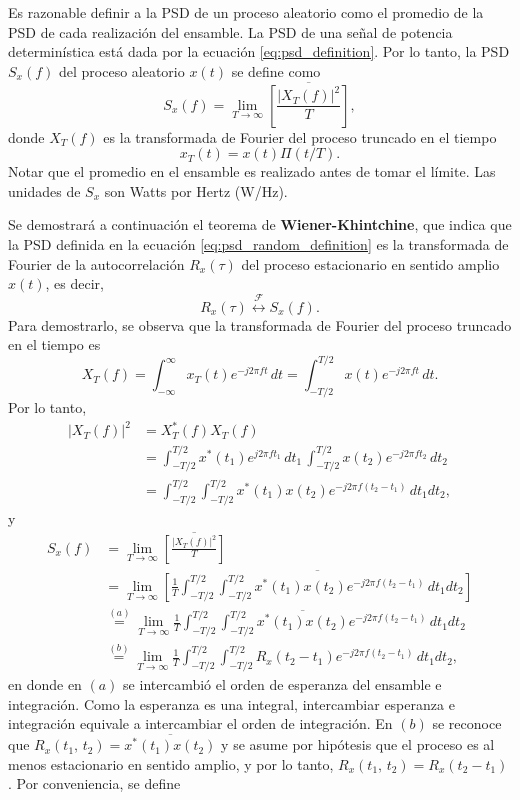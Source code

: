 \documentclass[a4paper]{article}
\begin{document}
Es razonable definir a la PSD de un proceso aleatorio como el promedio de la PSD de cada realización del ensamble. La PSD de una señal de potencia determinística está dada por la ecuación \ref{eq:psd_definition}. Por lo tanto, la PSD \(S_x(f)\) del proceso aleatorio \(x(t)\) se define como
\begin{equation}\label{eq:psd_random_definition}
 S_x(f)=\lim_{T\to\infty}\overline{\left[\frac{|X_T(f)|^2}{T}\right]},
\end{equation}
donde \(X_T(f)\) es la transformada de Fourier del proceso truncado en el tiempo
\[
 x_T(t)=x(t)\Pi(t/T).
\]
Notar que el promedio en el ensamble es realizado antes de tomar el límite. Las unidades de \(S_x\) son Watts por Hertz (W/Hz).

Se demostrará a continuación el teorema de \textbf{Wiener-Khintchine}, que indica que la PSD definida en la ecuación \ref{eq:psd_random_definition} es la transformada de Fourier de la autocorrelación \(R_x(\tau)\) del proceso estacionario en sentido amplio \(x(t)\), es decir,
\[
 R_x(\tau)\overset{\mathcal{F}}{\longleftrightarrow}S_x(f).
\]
Para demostrarlo, se observa que la transformada de Fourier del proceso truncado en el tiempo es
\[
 X_T(f)=\int_{-\infty}^{\infty}x_T(t)e^{-j2\pi ft}\,dt=\int_{-T/2}^{T/2}x(t)e^{-j2\pi ft}\,dt.
\]
Por lo tanto,
\begin{align*}
 |X_T(f)|^2 &=X^*_T(f)X_T(f)\\
   &=\int_{-T/2}^{T/2}x^*(t_1)e^{j2\pi ft_1}\,dt_1\,\int_{-T/2}^{T/2}x(t_2)e^{-j2\pi ft_2}\,dt_2\\
   &=\int_{-T/2}^{T/2}\int_{-T/2}^{T/2}x^*(t_1)x(t_2)e^{-j2\pi f(t_2-t_1)}\,dt_1dt_2,
\end{align*}
y
\begin{align*}
 S_x(f)&=\lim_{T\to\infty}\overline{\left[\frac{|X_T(f)|^2}{T}\right]}\\
      &=\lim_{T\to\infty}\overline{\left[\frac{1}{T}\int_{-T/2}^{T/2}\int_{-T/2}^{T/2}x^*(t_1)x(t_2)e^{-j2\pi f(t_2-t_1)}\,dt_1dt_2\right]}\\
      &\overset{(a)}{=}\lim_{T\to\infty}\frac{1}{T}\int_{-T/2}^{T/2}\int_{-T/2}^{T/2}\overline{x^*(t_1)x(t_2)}e^{-j2\pi f(t_2-t_1)}\,dt_1dt_2\\
      &\overset{(b)}{=}\lim_{T\to\infty}\frac{1}{T}\int_{-T/2}^{T/2}\int_{-T/2}^{T/2}R_x(t_2-t_1)e^{-j2\pi f(t_2-t_1)}\,dt_1dt_2,
\end{align*}
en donde en \((a)\) se intercambió el orden de esperanza del ensamble e integración. Como la esperanza es una integral, intercambiar esperanza e integración equivale a intercambiar el orden de integración. En \((b)\) se reconoce que \(R_x(t_1,\,t_2)=\overline{x^*(t_1)x(t_2)}\) y se asume por hipótesis que el proceso es al menos estacionario en sentido amplio, y por lo tanto, \(R_x(t_1,\,t_2)=R_x(t_2-t_1)\). Por conveniencia, se define
\end{document}

